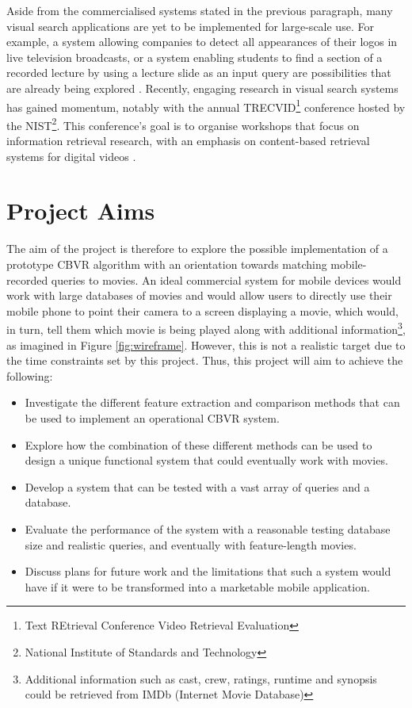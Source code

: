 Aside from the commercialised systems stated in the previous paragraph, many visual search applications are yet to be implemented for large-scale use. For example, a system allowing companies to detect all appearances of their logos in live television broadcasts, or a system enabling students to find a section of a recorded lecture by using a lecture slide as an input query are possibilities that are already being explored \cite{araujo2017i2v}.
Recently, engaging research in visual search systems has gained momentum, notably with the annual TRECVID\footnote{Text REtrieval Conference Video Retrieval Evaluation} conference \cite{2018trecvidawad} hosted by the NIST\footnote{National Institute of Standards and Technology}. This conference's goal is to organise workshops that focus on information retrieval research, with an emphasis on content-based retrieval systems for digital videos \cite{trecvid-general}.


\section{Project Aims}
\label{sec:introduction-project-aims}

The aim of the project is therefore to explore the possible implementation of a prototype CBVR algorithm with an orientation towards matching mobile-recorded queries to movies. An ideal commercial system for mobile devices would work with large databases of movies and would allow users to directly use their mobile phone to point their camera to a screen displaying a movie, which would, in turn, tell them which movie is being played along with additional information\footnote{Additional information such as cast, crew, ratings, runtime and synopsis could be retrieved from IMDb (Internet Movie Database)}, as imagined in Figure \ref{fig:wireframe}. However, this is not a realistic target due to the time constraints set by this project. Thus, this project will aim to achieve the following:

\begin{itemize}
    \item Investigate the different feature extraction and comparison methods that can be used to implement an operational CBVR system.
    \item Explore how the combination of these different methods can be used to design a unique functional system that could eventually work with movies.
    \item Develop a system that can be tested with a vast array of queries and a database.
    \item Evaluate the performance of the system with a reasonable testing database size and realistic queries, and eventually with feature-length movies.
    \item Discuss plans for future work and the limitations that such a system would have if it were to be transformed into a marketable mobile application.
\end{itemize}


